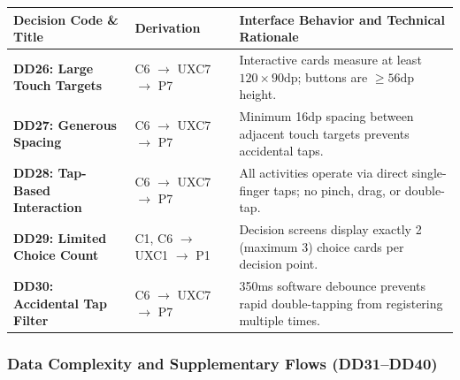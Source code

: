 \begin{xltabular}{\textwidth}{|p{3.5cm}|p{2.5cm}|X|}
\hline
\textbf{Decision Code \& Title} & \textbf{Derivation} & \textbf{Interface Behavior and Technical Rationale} \\ \hline
\endhead
\textbf{DD26: Large Touch Targets} & C6 $\rightarrow$ UXC7 $\rightarrow$ P7 & Interactive cards measure at least $120\times 90\text{dp}$; buttons are $\ge 56\text{dp}$ height. \\ \hline
\textbf{DD27: Generous Spacing} & C6 $\rightarrow$ UXC7 $\rightarrow$ P7 & Minimum 16dp spacing between adjacent touch targets prevents accidental taps. \\ \hline
\textbf{DD28: Tap-Based Interaction} & C6 $\rightarrow$ UXC7 $\rightarrow$ P7 & All activities operate via direct single-finger taps; no pinch, drag, or double-tap. \\ \hline
\textbf{DD29: Limited Choice Count} & C1, C6 $\rightarrow$ UXC1 $\rightarrow$ P1 & Decision screens display exactly 2 (maximum 3) choice cards per decision point. \\ \hline
\textbf{DD30: Accidental Tap Filter} & C6 $\rightarrow$ UXC7 $\rightarrow$ P7 & 350ms software debounce prevents rapid double-tapping from registering multiple times. \\ \hline
\end{xltabular}
\label{tab:c5_dd_motor}

\subsubsection{Data Complexity and Supplementary Flows (DD31--DD40)}

